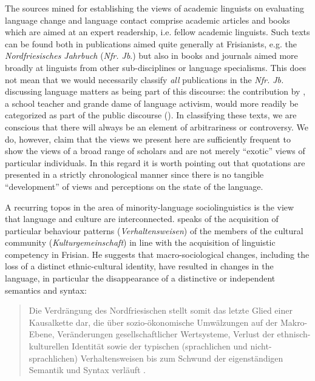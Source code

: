 \documentclass[output=paper]{langsci/langscibook}
\begin{document}
The sources mined for establishing the views of academic linguists on evaluating language change and language contact comprise academic articles and books which are aimed at an expert readership, i.e. fellow academic linguists. Such texts can be found both in publications aimed quite generally at Frisianists, e.g. the \textit{Nordfriesisches Jahrbuch} (\textit{Nfr. Jb}.) but also in books and journals aimed more broadly at linguists from other sub-disciplines or language specialisms. This does not mean that we would necessarily classify \textit{all} publications in the \textit{Nfr. Jb.} discussing language matters as being part of this discourse: the contribution by \citet{Ingwersen1966}, a school teacher and grande dame of language activism, would more readily be categorized as part of the public discourse (). In classifying these texts, we are conscious that there will always be an element of arbitrariness or controversy. We do, however, claim that the views we present here are sufficiently frequent to show the views of a broad range of scholars and are not merely “exotic” views of particular individuals. In this regard it is worth pointing out that quotations are presented in a strictly chronological manner since there is no tangible “development” of views and perceptions on the state of the language. 

A recurring topos in the area of minority-language sociolinguistics is the view that language and culture are interconnected. \citet[473]{Sjolin1997} speaks of the acquisition of particular behaviour patterns (\textit{Verhaltensweisen}) of the members of the cultural community (\textit{Kulturgemeinschaft}) in line with the acquisition of linguistic competency in Frisian. He suggests that macro-sociological changes, including the loss of a distinct ethnic-cultural identity, have resulted in changes in the language, in particular the disappearance of a distinctive or independent semantics and syntax: 

\begin{quote}
Die Verdrängung des Nordfriesischen stellt somit das letzte Glied einer Kausalkette dar, die über sozio-ökonomische Umwälzungen auf der Makro-Ebene, Veränderungen gesellschaftlicher Wertsysteme, Verlust der ethnisch-kulturellen Identität sowie der typischen (sprachlichen und nicht-sprachlichen) Verhaltensweisen bis zum Schwund der eigenständigen Semantik und Syntax verläuft \citep[473]{Sjolin1997}.\bigskip\\
\end{quote}
\end{document}
